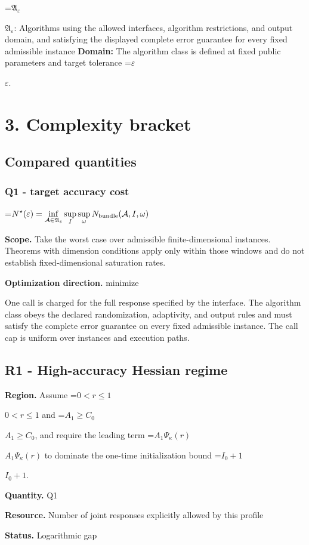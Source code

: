 \documentclass[10pt,a4paper]{article}
\newcommand{\AtlasMath}[1]{\par\begingroup\centering\setbox0=\hbox{$\displaystyle #1$}\ifdim\wd0>1.4\linewidth\typeout{ATLAS WIDE FORMULA: \the\wd0}\fi\ifdim\wd0>\linewidth\resizebox{\linewidth}{!}{\box0}\else\box0\fi\par\endgroup}
\newcommand{\AtlasInlineMath}[1]{\begingroup\setbox0=\hbox{$#1$}\ifdim\wd0>.4\linewidth\endgroup\AtlasMath{#1}\else\endgroup$#1$\fi}
\begin{document}
\AtlasInlineMath{\mathfrak A_\varepsilon}: Algorithms using the allowed interfaces, algorithm restrictions, and output domain, and satisfying the displayed complete error guarantee for every fixed admissible instance \textbf{Domain:} The algorithm class is defined at fixed public parameters and target tolerance \AtlasInlineMath{\varepsilon}.

\section{3. Complexity bracket}
\subsection{Compared quantities}
\subsubsection{Q1 - target accuracy cost}
\AtlasMath{N^\star(\varepsilon)=\inf_{\mathcal A\in\mathfrak A_\varepsilon}\sup_I \sup_\omega N_{\rm bundle}(\mathcal A,I,\omega)}
\textbf{Scope.} Take the worst case over admissible finite-dimensional instances. Theorems with dimension conditions apply only within those windows and do not establish fixed-dimensional saturation rates.

\textbf{Optimization direction.} minimize

One call is charged for the full response specified by the interface. The algorithm class obeys the declared randomization, adaptivity, and output rules and must satisfy the complete error guarantee on every fixed admissible instance. The call cap is uniform over instances and execution paths.

\subsection{R1 - High-accuracy Hessian regime}
\textbf{Region.} Assume \AtlasInlineMath{0<r\le1} and \AtlasInlineMath{A_1\ge C_0}, and require the leading term \AtlasInlineMath{A_1\Psi_\kappa(r)} to dominate the one-time initialization bound \AtlasInlineMath{I_0+1}.

\textbf{Quantity.} Q1

\textbf{Resource.} Number of joint responses explicitly allowed by this profile

\textbf{Status.} Logarithmic gap
\end{document}
